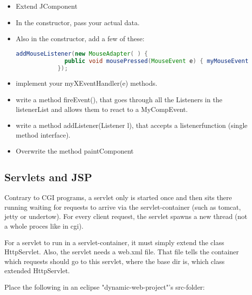  \begin{itemize}
    \item Extend JComponent
    \item In the constructor, pass your actual data.
    \item Also in the constructor, add a few of these: 
        \begin{lstlisting}[language=java]
            addMouseListener(new MouseAdapter( ) {
              public void mousePressed(MouseEvent e) { myMouseEventHandler(e); }
            });
        \end{lstlisting}
    \item implement your myXEventHandler(e) methods.
    \item write a method fireEvent(), that goes through all the Listeners in the listenerList and allows them to react to a MyCompEvent. 
    \item write a method addListener(Listener l), that accepts a listenerfunction (single method interface).
    \item Overwrite the method paintComponent
 \end{itemize}
 
 



\subsection{Servlets and JSP}

Contrary to CGI programs, a servlet only is started once and then sits there running waiting for requests to arrive via the servlet-container (such as tomcat, jetty or undertow). For every client request, the servlet spawns a new thread (not a whole proces like in cgi).

For a servlet to run in a servlet-container, it must simply extend the class HttpServlet. Also, the servlet needs a web.xml file. That file tells the container which requests should go to this servlet, where the base dir is, which class extended HttpServlet.


Place the following in an eclipse "dynamic-web-project"'s src-folder:

